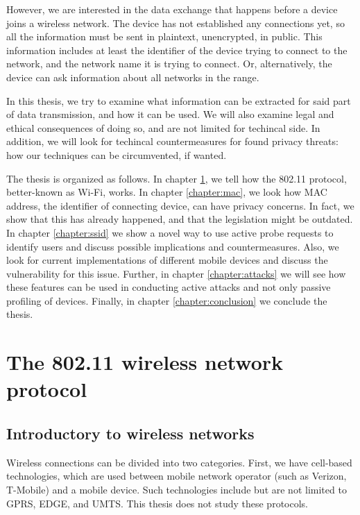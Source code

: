 \documentclass[12pt,a4paper,oneside,pdftex]{report}
\begin{document}
However, we are interested in the data exchange that happens before a device joins a wireless network. The device has not established any connections yet, so all the information must be sent in plaintext, unencrypted, in public. This information includes at least the identifier of the device trying to connect to the network, and the network name it is trying to connect. Or, alternatively, the device can ask information about all networks in the range.


In this thesis, we try to examine what information can be extracted for said part of data transmission, and how it can be used. We will also examine legal and ethical consequences of doing so, and are not limited for techincal side. In addition, we will look for techincal countermeasures for found privacy threats: how our techniques can be circumvented, if wanted.

The thesis is organized as follows. In chapter \ref{chapter:protocol}, we tell how the 802.11 protocol, better-known as Wi-Fi, works. In chapter \ref{chapter:mac}, we look how MAC address, the identifier of connecting device, can have privacy concerns. In fact, we show that this has already happened, and that the legislation might be outdated. In chapter \ref{chapter:ssid} we show a novel way to use active probe requests to identify users and discuss possible implications and countermeasures. Also, we look for current implementations of different mobile devices and discuss the vulnerability for this issue. Further, in chapter \ref{chapter:attacks} we will see how these features can be used in conducting active attacks and not only passive profiling of devices. Finally, in chapter \ref{chapter:conclusion} we conclude the thesis.

\chapter{The 802.11 wireless network protocol}
\label{chapter:protocol}

\section{Introductory to wireless networks}
\label{sec:intro_wireless}

Wireless connections can be divided into two categories. First, we have cell-based technologies, which are used between mobile network operator (such as Verizon, T-Mobile) and a mobile device. Such technologies include but are not limited to GPRS, EDGE, and UMTS. This thesis does not study these protocols.
\end{document}
